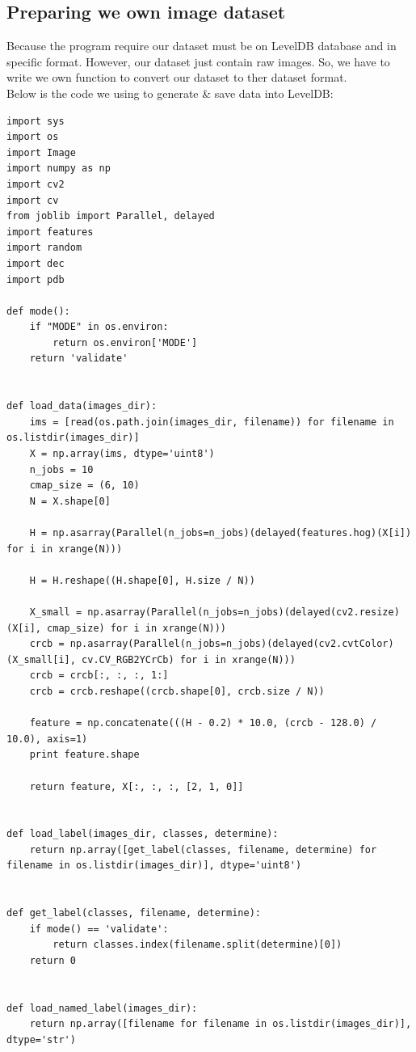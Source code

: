 \documentclass[hidelinks,12pt,a4paper]{report}
\begin{document}
\subsection{Preparing we own image dataset}
Because the program require our dataset must be on LevelDB database and in specific format. However, our dataset just contain raw images. So, we have to write we own function to convert our dataset to ther dataset format.\newline\\
Below is the code we using to generate \& save data into LevelDB:
\begin{lstlisting}
import sys
import os
import Image
import numpy as np
import cv2
import cv
from joblib import Parallel, delayed
import features
import random
import dec
import pdb

def mode():
    if "MODE" in os.environ:
        return os.environ['MODE']
    return 'validate'


def load_data(images_dir):
    ims = [read(os.path.join(images_dir, filename)) for filename in os.listdir(images_dir)]
    X = np.array(ims, dtype='uint8')
    n_jobs = 10
    cmap_size = (6, 10)
    N = X.shape[0]

    H = np.asarray(Parallel(n_jobs=n_jobs)(delayed(features.hog)(X[i]) for i in xrange(N)))

    H = H.reshape((H.shape[0], H.size / N))

    X_small = np.asarray(Parallel(n_jobs=n_jobs)(delayed(cv2.resize)(X[i], cmap_size) for i in xrange(N)))
    crcb = np.asarray(Parallel(n_jobs=n_jobs)(delayed(cv2.cvtColor)(X_small[i], cv.CV_RGB2YCrCb) for i in xrange(N)))
    crcb = crcb[:, :, :, 1:]
    crcb = crcb.reshape((crcb.shape[0], crcb.size / N))

    feature = np.concatenate(((H - 0.2) * 10.0, (crcb - 128.0) / 10.0), axis=1)
    print feature.shape

    return feature, X[:, :, :, [2, 1, 0]]


def load_label(images_dir, classes, determine):
    return np.array([get_label(classes, filename, determine) for filename in os.listdir(images_dir)], dtype='uint8')


def get_label(classes, filename, determine):
    if mode() == 'validate':
        return classes.index(filename.split(determine)[0])
    return 0


def load_named_label(images_dir):
    return np.array([filename for filename in os.listdir(images_dir)], dtype='str')


\end{lstlisting}
\end{document}
